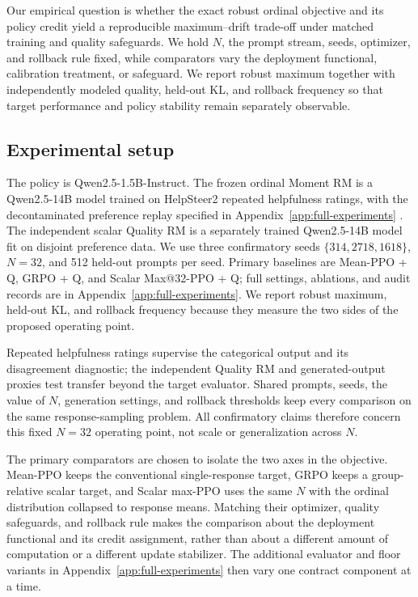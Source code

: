 \documentclass{article}
\theoremstyle{definition}
\theoremstyle{remark}
\begin{document}
Our empirical question is whether the exact robust ordinal objective and its
policy credit yield a reproducible maximum--drift trade-off under matched
training and quality safeguards.
We hold \(N\), the prompt stream, seeds, optimizer, and rollback rule
fixed, while comparators vary the deployment functional, calibration
treatment, or safeguard. We report robust maximum together with
independently modeled quality, held-out KL, and rollback frequency so that target
performance and policy stability remain separately observable.

\subsection{Experimental setup}
The policy is Qwen2.5-1.5B-Instruct.  The frozen ordinal Moment RM is a
Qwen2.5-14B model trained on HelpSteer2 repeated helpfulness ratings, with the
decontaminated preference replay specified in Appendix~\ref{app:full-experiments}
\citep{wang2024helpsteer2}.  The independent scalar Quality RM is a separately
trained Qwen2.5-14B model fit on disjoint preference data.  We use
three confirmatory seeds \(\{314,2718,1618\}\), \(N=32\), and 512 held-out
prompts per seed.  Primary baselines are Mean-PPO + Q, GRPO + Q, and Scalar
Max@32-PPO + Q; full settings, ablations, and audit records are in
Appendix~\ref{app:full-experiments}.  We report robust maximum, held-out KL,
and rollback frequency because they measure the two sides of the proposed
operating point.

Repeated helpfulness ratings supervise the categorical output and its
disagreement diagnostic; the independent Quality RM and generated-output
proxies test transfer beyond the target evaluator.  Shared prompts, seeds,
the value of \(N\), generation settings, and rollback thresholds keep every comparison on the same
response-sampling problem.  All confirmatory claims therefore concern this
fixed \(N=32\) operating point, not scale or generalization across \(N\).

The primary comparators are chosen to isolate the two axes in the objective.
Mean-PPO keeps the conventional single-response target, GRPO keeps a
group-relative scalar target, and Scalar max-PPO uses the same \(N\)
with the ordinal distribution collapsed to response means.  Matching their
optimizer, quality safeguards, and rollback rule makes the comparison about
the deployment functional and its credit assignment, rather than about a
different amount of computation or a different update stabilizer.  The
additional evaluator and floor variants in Appendix~\ref{app:full-experiments}
then vary one contract component at a time.
\end{document}
